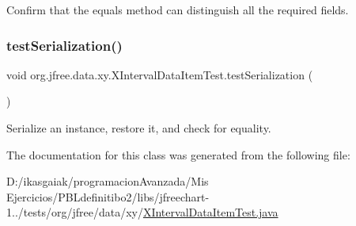 Confirm that the equals method can distinguish all the required fields. \mbox{\label{classorg_1_1jfree_1_1data_1_1xy_1_1_x_interval_data_item_test_aeb80b082b5c38ce27508c0d8a2353eb8}} 
\subsubsection{\texorpdfstring{test\+Serialization()}{testSerialization()}}
{\footnotesize\ttfamily void org.\+jfree.\+data.\+xy.\+X\+Interval\+Data\+Item\+Test.\+test\+Serialization (\begin{DoxyParamCaption}{ }\end{DoxyParamCaption})}

Serialize an instance, restore it, and check for equality. 

The documentation for this class was generated from the following file\+:\begin{DoxyCompactItemize}
\item 
D\+:/ikasgaiak/programacion\+Avanzada/\+Mis Ejercicios/\+P\+B\+Ldefinitibo2/libs/jfreechart-\/1../tests/org/jfree/data/xy/\mbox{\hyperlink{_x_interval_data_item_test_8java}{X\+Interval\+Data\+Item\+Test.\+java}}\end{DoxyCompactItemize}
